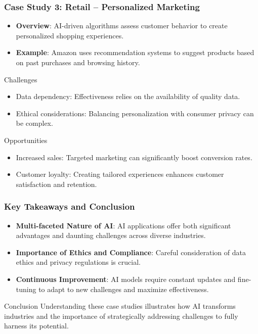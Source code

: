 \documentclass{beamer}
\begin{document}
\begin{frame}[fragile]
    \frametitle{Case Study 3: Retail – Personalized Marketing}
    \begin{itemize}
        \item \textbf{Overview}: AI-driven algorithms assess customer behavior to create personalized shopping experiences.
        \item \textbf{Example}: Amazon uses recommendation systems to suggest products based on past purchases and browsing history.
    \end{itemize}

    \begin{block}{Challenges}
        \begin{itemize}
            \item Data dependency: Effectiveness relies on the availability of quality data.
            \item Ethical considerations: Balancing personalization with consumer privacy can be complex.
        \end{itemize}
    \end{block}

    \begin{block}{Opportunities}
        \begin{itemize}
            \item Increased sales: Targeted marketing can significantly boost conversion rates.
            \item Customer loyalty: Creating tailored experiences enhances customer satisfaction and retention.
        \end{itemize}
    \end{block}
\end{frame}

\begin{frame}[fragile]
    \frametitle{Key Takeaways and Conclusion}
    \begin{itemize}
        \item \textbf{Multi-faceted Nature of AI}: AI applications offer both significant advantages and daunting challenges across diverse industries.
        \item \textbf{Importance of Ethics and Compliance}: Careful consideration of data ethics and privacy regulations is crucial.
        \item \textbf{Continuous Improvement}: AI models require constant updates and fine-tuning to adapt to new challenges and maximize effectiveness.
    \end{itemize}

    \begin{block}{Conclusion}
        Understanding these case studies illustrates how AI transforms industries and the importance of strategically addressing challenges to fully harness its potential.
    \end{block}
\end{frame}
\end{document}
